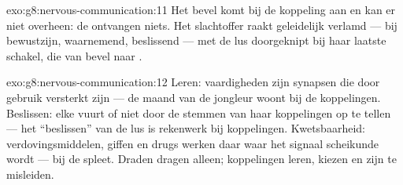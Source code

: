 \begin{solution}{exo:g8:nervous-communication:11}
Het bevel komt bij de koppeling aan en kan er niet overheen: de 
ontvangen niets. Het slachtoffer raakt geleidelijk verlamd --- bij bewustzijn,
waarnemend, beslissend --- met de lus doorgeknipt bij haar laatste schakel,
die van bevel naar .
\end{solution}

\begin{solution}{exo:g8:nervous-communication:12}
Leren: vaardigheden zijn synapsen die door gebruik versterkt zijn --- de
maand van de jongleur woont bij de koppelingen. Beslissen: elke 
vuurt of niet door de stemmen van haar koppelingen op te tellen --- het
``beslissen'' van de lus is rekenwerk bij koppelingen. Kwetsbaarheid:
verdovingsmiddelen, giffen en drugs werken daar waar het signaal
scheikunde wordt --- bij de spleet. Draden dragen alleen; koppelingen
leren, kiezen en zijn te misleiden.
\end{solution}

